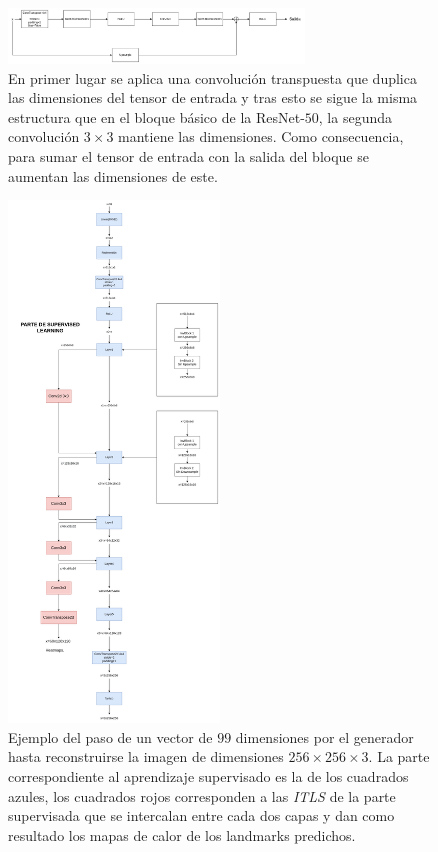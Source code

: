                 \begin{figure}[!h]
                    \centering
                    \includegraphics[width=0.7\textwidth]{img/bloque_invresnet.png}
                    \caption{En primer lugar se aplica una convolución transpuesta que duplica las dimensiones del tensor de entrada y tras esto se sigue la misma estructura que en el bloque básico de la ResNet-$50$, la segunda convolución $3\times 3$ mantiene las dimensiones. Como consecuencia, para sumar el tensor de entrada con la salida del bloque se aumentan las dimensiones de este.}
                    \label{fig:Bloque_Decoder}
                \end{figure}

                \begin{figure}[!h]
                    \centering
                    \includegraphics[width=0.5\textwidth]{img/paso_generator.png}
                    \caption{Ejemplo del paso de un vector de $99$ dimensiones por el generador hasta reconstruirse la imagen de dimensiones $256 \times 256 \times 3$. La parte correspondiente al aprendizaje supervisado es la de los cuadrados azules, los cuadrados rojos corresponden a las \textit{ITLS} de la parte supervisada que se intercalan entre cada dos capas y dan como resultado los mapas de calor de los landmarks predichos.}
                    \label{fig:Paso_Generator}
                \end{figure}

